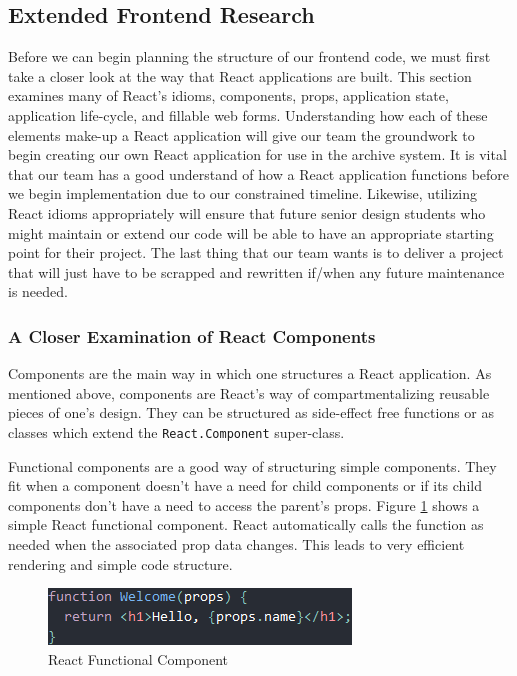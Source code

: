 \documentclass[12pt]{report}
\begin{document}
\begin{enumerate}
\subsection*{Extended Frontend Research}

Before we can begin planning the structure of our frontend code, we must first take a closer look at the way that React applications are built. This section examines many of React's idioms, components, props, application state, application life-cycle, and fillable web forms. Understanding how each of these elements make-up a React application will give our team the groundwork to begin creating our own React application for use in the archive system. It is vital that our team has a good understand of how a React application functions before we begin implementation due to our constrained timeline. Likewise, utilizing React idioms appropriately will ensure that future senior design students who might maintain or extend our code will be able to have an appropriate starting point for their project. The last thing that our team wants is to deliver a project that will just have to be scrapped and rewritten if/when any future maintenance is needed.

\subsubsection*{A Closer Examination of React Components}

Components are the main way in which one structures a React application. As mentioned above, components are React's way of compartmentalizing reusable pieces of one's design. They can be structured as side-effect free functions or as classes which extend the \texttt{React.Component} super-class.

Functional components are a good way of structuring simple components. They fit when a component doesn't have a need for child components or if its child components don't have a need to access the parent's props. Figure \ref{fig:reactfunctionalcomponent} shows a simple React functional component.\cite{reactcomponentsandprops} React automatically calls the function as needed when the associated prop data changes. This leads to very efficient rendering and simple code structure.

\begin{figure}[h]
	\centering
	\includegraphics[scale=0.5]{react_functional_component}
	\caption{React Functional Component}
	\label{fig:reactfunctionalcomponent}
\end{figure}


\end{enumerate}
\end{document}
